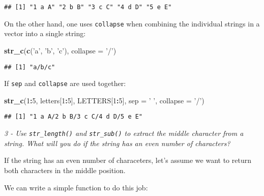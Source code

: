 \documentclass[]{article}
\newenvironment{Shaded}{\begin{snugshade}}{\end{snugshade}}
\newcommand{\KeywordTok}[1]{\textcolor[rgb]{0.13,0.29,0.53}{\textbf{#1}}}
\newcommand{\DataTypeTok}[1]{\textcolor[rgb]{0.13,0.29,0.53}{#1}}
\newcommand{\DecValTok}[1]{\textcolor[rgb]{0.00,0.00,0.81}{#1}}
\newcommand{\StringTok}[1]{\textcolor[rgb]{0.31,0.60,0.02}{#1}}
\newcommand{\OperatorTok}[1]{\textcolor[rgb]{0.81,0.36,0.00}{\textbf{#1}}}
\newcommand{\NormalTok}[1]{#1}
\theoremstyle{definition}
\theoremstyle{definition}
\theoremstyle{definition}
\theoremstyle{remark}
\begin{document}
\begin{verbatim}
## [1] "1 a A" "2 b B" "3 c C" "4 d D" "5 e E"
\end{verbatim}

On the other hand, one uses \texttt{collapse} when combining the
individual strings in a vector into a single string:

\begin{Shaded}
\begin{Highlighting}[]
\KeywordTok{str_c}\NormalTok{(}\KeywordTok{c}\NormalTok{(}\StringTok{'a'}\NormalTok{, }\StringTok{'b'}\NormalTok{, }\StringTok{'c'}\NormalTok{), }\DataTypeTok{collapse =} \StringTok{'/'}\NormalTok{)}
\end{Highlighting}
\end{Shaded}

\begin{verbatim}
## [1] "a/b/c"
\end{verbatim}

If \texttt{sep} and \texttt{collapse} are used together:

\begin{Shaded}
\begin{Highlighting}[]
\KeywordTok{str_c}\NormalTok{(}\DecValTok{1}\OperatorTok{:}\DecValTok{5}\NormalTok{, letters[}\DecValTok{1}\OperatorTok{:}\DecValTok{5}\NormalTok{], LETTERS[}\DecValTok{1}\OperatorTok{:}\DecValTok{5}\NormalTok{], }\DataTypeTok{sep =} \StringTok{' '}\NormalTok{, }\DataTypeTok{collapse =} \StringTok{'/'}\NormalTok{)}
\end{Highlighting}
\end{Shaded}

\begin{verbatim}
## [1] "1 a A/2 b B/3 c C/4 d D/5 e E"
\end{verbatim}

\emph{3 - Use \texttt{str\_length()} and \texttt{str\_sub()} to extract
the middle character from a string. What will you do if the string has
an even number of characters?}

If the string has an even number of characeters, let's assume we want to
return both characters in the middle position.

We can write a simple function to do this job:
\end{document}
